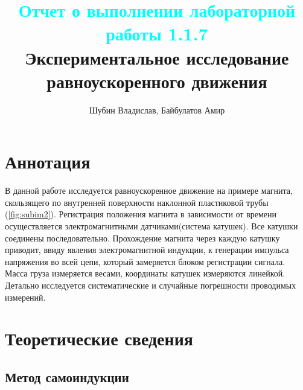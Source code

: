 \documentclass[
	a4paper, %
	12pt, %
]{article}
\title{
	\textcolor{cyan}{Отчет о выполнении лабораторной работы 1.1.7}
	\\
	Экспериментальное исследование равноускоренного движения
}
\author{Шубин Владислав, Байбулатов Амир}
\begin{document}
    
	
	\maketitle
	
	\section{Аннотация}
	В данной работе исследуется равноускоренное движение на примере магнита, скользящего по внутренней поверхности наклонной пластиковой трубы (\ref{fig:subim2}). Регистрация положения магнита в зависимости от времени осуществляется электромагнитными датчиками(система катушек). Все катушки соединены последовательно. Прохождение магнита через каждую катушку приводит, ввиду явления электромагнитной индукции, к генерации импульса напряжения во всей цепи, который замеряется блоком регистрации сигнала. Масса груза измеряется весами, координаты катушек измеряются линейкой. Детально исследуется систематические и случайные погрешности проводимых измерений.
	
	
	\section{Теоретические сведения}
	
	\subsection{Метод самоиндукции}
	
\end{document}
